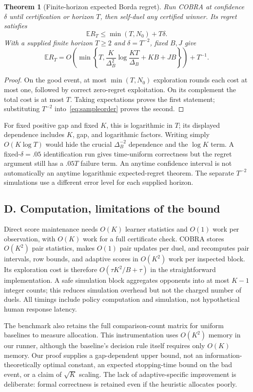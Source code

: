\documentclass[11pt,a4paper]{article}
\newtheorem{theorem}{Theorem}\newtheorem{lemma}{Lemma}
\newcommand{\E}{\mathbb E}\newcommand{\Prb}{\mathbb P}
\begin{document}
\begin{theorem}[Finite-horizon expected Borda regret]
Run COBRA at confidence $\delta$ until certification or horizon $T$, then self-duel any certified winner. Its regret satisfies
\[
\E R_T\le\min(T,N_0)+T\delta.
\]
With a supplied finite horizon $T\ge2$ and $\delta=T^{-2}$, fixed $B,J$ give
\[
\E R_T=O\!\left(\min\!\left\{T,\frac K{\Delta_B^2}\log\frac{KT}{\Delta_B}+KB+JB\right\}\right)+T^{-1}.
\]
\end{theorem}
\begin{proof}
On the good event, at most $\min(T,N_0)$ exploration rounds each cost at most one, followed by correct zero-regret exploitation. On its complement the total cost is at most $T$. Taking expectations proves the first statement; substituting $T^{-2}$ into~\eqref{eq:sampleorder} proves the second.
\end{proof}
For fixed positive gap and fixed $K$, this is logarithmic in $T$; its displayed dependence includes $K$, gap, and logarithmic factors. Writing simply $O(K\log T)$ would hide the crucial $\Delta_B^{-2}$ dependence and the $\log K$ term. A fixed-$\delta=.05$ identification run gives time-uniform correctness but the regret argument still has a $.05T$ failure term. An anytime confidence interval is not automatically an anytime logarithmic expected-regret theorem. The separate $T^{-2}$ simulations use a different error level for each supplied horizon.

\subsection{D. Computation, limitations of the bound}
Direct score maintenance needs $O(K)$ learner statistics and $O(1)$ work per observation, with $O(K)$ work for a full certificate check. COBRA stores $O(K^2)$ pair statistics, makes $O(1)$ pair updates per duel, and recomputes pair intervals, row bounds, and adaptive scores in $O(K^2)$ work per inspected block. Its exploration cost is therefore $O(\tau K^2/B+\tau)$ in the straightforward implementation. A safe simulation block aggregates opponents into at most $K-1$ integer counts; this reduces simulation overhead but not the charged number of duels. All timings include policy computation and simulation, not hypothetical human response latency.

The benchmark also retains the full comparison-count matrix for uniform baselines to measure allocation. This instrumentation uses $O(K^2)$ memory in our runner, although the baseline's decision rule itself requires only $O(K)$ memory. Our proof supplies a gap-dependent upper bound, not an information-theoretically optimal constant, an expected stopping-time bound on the bad event, or a claim of $\sqrt K$ scaling. The lack of adaptive-specific improvement is deliberate: formal correctness is retained even if the heuristic allocates poorly.
\end{document}
